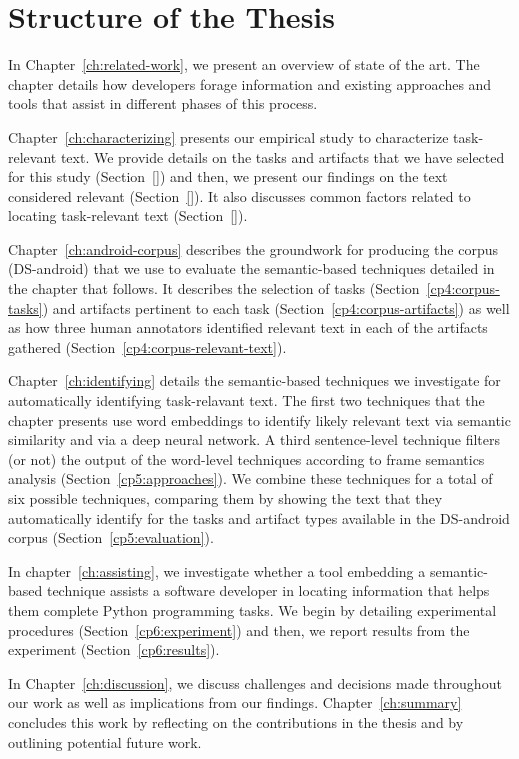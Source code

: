 \section{Structure of the Thesis}
\label{cp1:organization}

In Chapter~\ref{ch:related-work}, we present an overview of state of the art. The chapter details 
how developers forage information and existing approaches and tools 
that assist in different phases of this process.


Chapter~\ref{ch:characterizing} presents our empirical study to characterize task-relevant text.
We provide details on the tasks and artifacts that we have selected for this study (Section~\ref{})
and then, we present our findings on the text considered relevant (Section~\ref{}).
It also discusses common factors related to locating task-relevant text (Section~\ref{}).


Chapter~\ref{ch:android-corpus} describes the groundwork 
for producing the corpus (\acs{DS-android}) that we use to evaluate the semantic-based techniques 
detailed in the chapter that follows. It describes the selection of tasks (Section~\ref{cp4:corpus-tasks}) and 
artifacts pertinent to each task (Section~\ref{cp4:corpus-artifacts})
as well as how three human annotators identified relevant text in each of the artifacts gathered (Section~\ref{cp4:corpus-relevant-text}).


Chapter~\ref{ch:identifying} details the semantic-based techniques we investigate for automatically 
identifying task-relavant text.
The first two techniques that the chapter presents 
use word embeddings to identify likely relevant text via semantic similarity
and via a deep neural network.
A third sentence-level technique filters (or not) 
the output of the word-level techniques according to frame semantics analysis (Section~\ref{cp5:approaches}).
We combine these techniques for a total of six possible techniques, comparing them by showing
the text that they automatically identify for the tasks and artifact types
available in the \acs{DS-android} corpus  (Section~\ref{cp5:evaluation}).




In chapter~\ref{ch:assisting}, 
we investigate 
whether a tool embedding a semantic-based technique assists a software developer in locating information
that helps them complete Python programming tasks. We begin by detailing experimental procedures (Section~\ref{cp6:experiment})
and then, we report results from the experiment (Section~\ref{cp6:results}).


In Chapter~\ref{ch:discussion}, we discuss challenges and decisions 
made throughout our work 
as well as implications from our findings. 
Chapter~\ref{ch:summary} concludes this work by reflecting on the contributions in the thesis
and by outlining  potential future work. 

